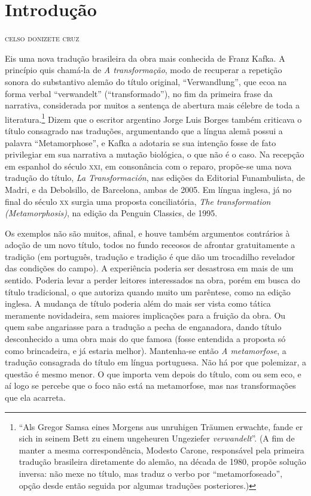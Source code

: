
\chapter*{Introdução}

\begin{flushright}
\textsc{celso donizete cruz}
\end{flushright}


\noindent{}Eis uma nova tradução brasileira da obra mais conhecida de Franz Kafka.
A princípio quis chamá-la de \textit{A transformação}, modo de
recuperar a repetição sonora do substantivo alemão do título original,
“Verwandlung”, que ecoa na forma verbal “verwandelt” (“transformado”),
no fim da primeira frase da narrativa, considerada por muitos a
sentença de abertura mais célebre de toda a literatura.\footnote{ “Als 
Gregor Samsa eines Morgens aus unruhigen
Träumen erwachte, fande er sich in seinem Bett zu einem ungeheuren
Ungeziefer \textit{verwandelt}”. (A fim de manter a mesma
correspondência, Modesto Carone, responsável pela primeira tradução
brasileira diretamente do alemão, na década de 1980,
propõe solução inversa: não mexe no título, mas traduz o verbo por
“metamorfoseado”, opção desde então seguida por algumas traduções
posteriores.)} Dizem que o escritor argentino Jorge Luis Borges também
criticava o título consagrado nas traduções, argumentando que a língua
alemã possui a palavra “Metamorphose”, e Kafka a adotaria se sua
intenção fosse de fato privilegiar em sua narrativa a mutação
biológica, o que não é o caso. Na recepção em espanhol do século \textsc{xxi}, em
consonância com o reparo, propõe-se uma nova tradução do título,
\textit{La Transformación}, nas edições da Editorial Funambulista, de
Madri, e da Debolsillo, de Barcelona, ambas de 2005. Em língua inglesa,
já no final do século \textsc{xx} surgia uma proposta conciliatória, \textit{The
transformation (Metamorphosis)}, na edição da Penguin Classics, de
1995.

Os exemplos não são muitos, afinal, e houve também argumentos contrários
à adoção de um novo título, todos no fundo receosos de afrontar
gratuitamente a tradição (em português, tradução e tradição é que dão
um trocadilho revelador das condições do campo). A experiência poderia
ser desastrosa em mais de um sentido. Poderia levar a perder leitores
interessados na obra, porém em busca do título tradicional, o que
autoriza quando muito um parêntese, como na edição inglesa. A
mudança de título poderia além do mais ser vista como tática meramente
novidadeira, sem maiores implicações para a fruição da obra. Ou quem
sabe angariasse para a tradução a pecha de enganadora, dando título
desconhecido a uma obra mais do que famosa (fosse entendida a proposta
só como brincadeira, e já estaria melhor). Mantenha-se então
\textit{A metamorfose}, a tradução consagrada do título em língua
portuguesa. Não há por que polemizar, a questão é mesmo menor. O que
importa vem depois do título, com ou sem eco, e aí logo se percebe que
o foco não está na metamorfose, mas nas transformações que ela
acarreta.

